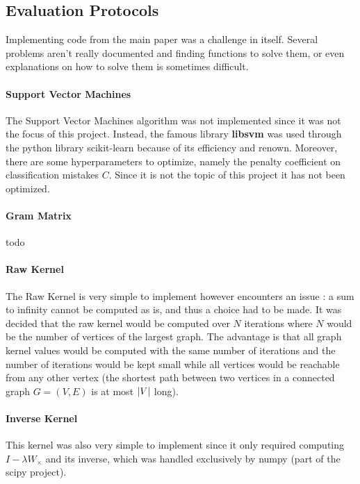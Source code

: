 \documentclass{article}
\DeclarePairedDelimiter{\abs}{\lvert}{\rvert}
\theoremstyle{definition}
\begin{document}
\subsection{Evaluation Protocols}
Implementing code from the main paper was a challenge in itself. Several problems aren't really documented and finding functions to solve them, or even explanations on how to solve them is sometimes difficult.
\paragraph{Support Vector Machines}
The Support Vector Machines algorithm was not implemented since it was not the focus of this project. Instead, the famous library \textbf{libsvm}\cite{cc2011libsvm} was used through the python library scikit-learn\cite{pedregosa2011scikit} because of its efficiency and renown. Moreover, there are some hyperparameters to optimize, namely the penalty coefficient on classification mistakes $C$. Since it is not the topic of this project it has not been optimized.
\paragraph{Gram Matrix}todo
\paragraph{Raw Kernel}
The Raw Kernel is very simple to implement however encounters an issue : a sum to infinity cannot be computed as is, and thus a choice had to be made. It was decided that the raw kernel would be computed over $N$ iterations where $N$ would be the number of vertices of the largest graph. The advantage is that all graph kernel values would be computed with the same number of iterations and the number of iterations would be kept small while all vertices would be reachable from any other vertex (the shortest path between two vertices in a connected graph $G=(V,E)$ is at most $\abs{V}$ long).  
\paragraph{Inverse Kernel}
This kernel was also very simple to implement  since it only required computing $I-\lambda W_{\times}$ and its inverse, which was handled exclusively by numpy (part of the scipy project).
\end{document}
